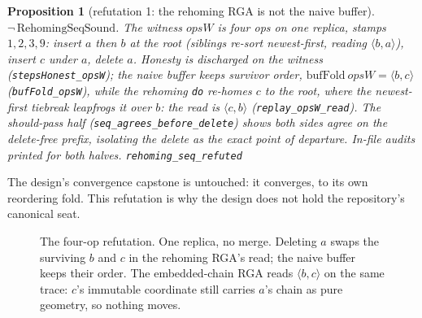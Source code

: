 \documentclass[11pt]{article}
\newtheorem{proposition}[theorem]{Proposition}
\newcommand{\lean}[1]{\texttt{#1}}
\newcommand{\code}[1]{\texttt{#1}}
\newcommand{\del}{\mathsf{del}}
\begin{document}
\begin{proposition}[refutation 1: the rehoming RGA is not the naive
buffer]
\label{prop:rehomingrefuted}
$\neg\,\mathrm{RehomingSeqSound}$. The witness $\mathit{opsW}$ is
four ops on one replica, stamps $1, 2, 3, 9$: insert $a$ then $b$ at
the root (siblings re-sort newest-first, reading
$\langle b, a\rangle$), insert $c$ under $a$, delete $a$. Honesty is
discharged on the witness (\lean{stepsHonest\_opsW}); the naive
buffer keeps survivor order, $\mathrm{bufFold}\ \mathit{opsW} =
\langle b, c \rangle$ (\lean{bufFold\_opsW}), while the rehoming
\code{do} re-homes $c$ to the root, where the newest-first tiebreak
leapfrogs it over $b$: the read is $\langle c, b\rangle$
(\lean{replay\_opsW\_read}). The should-pass half
(\lean{seq\_agrees\_before\_delete}) shows both sides agree on the
delete-free prefix, isolating the delete as the exact point of
departure. In-file audits printed for both halves.
\hfill\lean{rehoming\_seq\_refuted}
\end{proposition}

\noindent The design's convergence capstone is untouched: it
converges, to its own reordering fold. This refutation is why the design
does not hold the repository's canonical seat.

\begin{figure}[h]
\centering
{}
\caption{The four-op refutation. One replica, no merge. Deleting $a$
swaps the surviving $b$ and $c$ in the rehoming RGA's read; the naive
buffer keeps their order. The embedded-chain RGA reads
$\langle b, c\rangle$ on the same trace: $c$'s immutable coordinate
still carries $a$'s chain as pure geometry, so nothing moves.}
\label{fig:refutation}
\end{figure}
\end{document}
